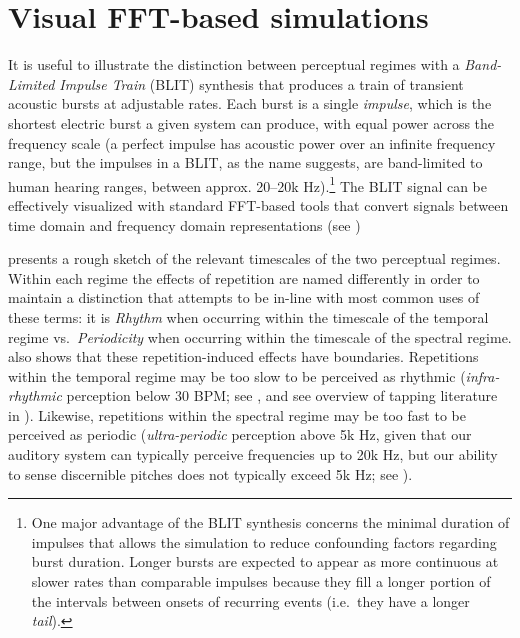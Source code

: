 \section{Visual FFT-based simulations}\label{sec:blitit}

It is useful to illustrate the distinction between perceptual regimes with a \emph{Band-Limited Impulse Train} (BLIT) synthesis that produces a train of transient acoustic bursts at adjustable rates.
Each burst is a single \emph{impulse}, which is the shortest electric burst a given system can produce, with equal power across the frequency scale (a perfect impulse has acoustic power over an infinite frequency range, but the impulses in a BLIT, as the name suggests, are band-limited to human hearing ranges, between approx. 20--20k Hz).\footnote{One major advantage of the BLIT synthesis concerns the minimal duration of impulses that allows the simulation to reduce confounding factors regarding burst duration. Longer bursts are expected to appear as more continuous at slower rates than comparable impulses because they fill a longer portion of the intervals between onsets of recurring events (i.e.~they have a longer \emph{tail}).}
The BLIT signal can be effectively visualized with standard FFT-based tools that convert signals between time domain and frequency domain representations (see )

 presents a rough sketch of the relevant timescales of the two perceptual regimes. Within each regime the effects of repetition are named differently in order to maintain a distinction that attempts to be in-line with most common uses of these terms: it is \emph{Rhythm} when occurring within the timescale of the temporal regime vs.~\emph{Periodicity} when occurring within the timescale of the spectral regime.  also shows that these repetition-induced effects have boundaries. Repetitions within the temporal regime may be too slow to be perceived as rhythmic (\emph{infra-rhythmic} perception below 30 BPM; see \citealt{fraisse1984perception, farbood2013temporal}, and see overview of tapping literature in \citealt{repp2005sensorimotor}). Likewise, repetitions within the spectral regime may be too fast to be perceived as periodic (\emph{ultra-periodic} perception above 5k Hz, given that our auditory system can typically perceive frequencies up to 20k Hz, but our ability to sense discernible pitches does not typically exceed 5k Hz; see \citealt{ward1954subjective, attneave1971pitch}).%



